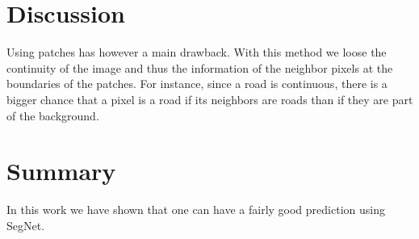 \documentclass[10pt,conference,compsocconf]{IEEEtran}
\begin{document}
\section{Discussion}
Using patches has however a main drawback. With this method we loose the continuity of the image and thus the information of the neighbor pixels at the boundaries of the patches. For instance, since a road is continuous, there is a bigger chance that a pixel is a road if its neighbors are roads than if they are part of the background.\\

\section{Summary}
In this work we have shown that one can have a fairly good prediction using SegNet.

\end{document}
